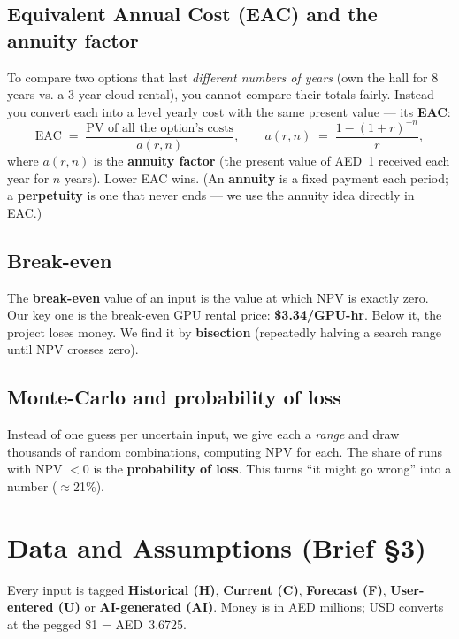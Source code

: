 \documentclass[11pt,a4paper]{article}
\newcommand{\term}[1]{\textcolor{tvblue}{\textbf{#1}}}
\begin{document}
\subsection{Equivalent Annual Cost (EAC) and the annuity factor}
To compare two options that last \emph{different numbers of years} (own the hall for 8 years vs. a
3-year cloud rental), you cannot compare their totals fairly. Instead you convert each into a level
yearly cost with the same present value --- its \term{EAC}:
\[
  \text{EAC} \;=\; \frac{\text{PV of all the option's costs}}{a(r,n)},
  \qquad
  a(r,n) \;=\; \frac{1-(1+r)^{-n}}{r},
\]
where $a(r,n)$ is the \term{annuity factor} (the present value of AED~1 received each year for $n$
years). Lower EAC wins. (An \term{annuity} is a fixed payment each period; a \term{perpetuity} is one
that never ends --- we use the annuity idea directly in EAC.)

\subsection{Break-even}
The \term{break-even} value of an input is the value at which NPV is exactly zero. Our key one is the
break-even GPU rental price: \textbf{\$3.34/GPU-hr}. Below it, the project loses money. We find it by
\term{bisection} (repeatedly halving a search range until NPV crosses zero).

\subsection{Monte-Carlo and probability of loss}
Instead of one guess per uncertain input, we give each a \emph{range} and draw thousands of random
combinations, computing NPV for each. The share of runs with NPV $<0$ is the \term{probability of
loss}. This turns ``it might go wrong'' into a number ($\approx$21\%).

\section{Data and Assumptions (Brief \S3)}
\label{sec:data}
Every input is tagged \term{Historical (H)}, \term{Current (C)}, \term{Forecast (F)},
\term{User-entered (U)} or \term{AI-generated (AI)}. Money is in AED millions; USD converts at the
pegged \$1 = AED~3.6725.
\end{document}
